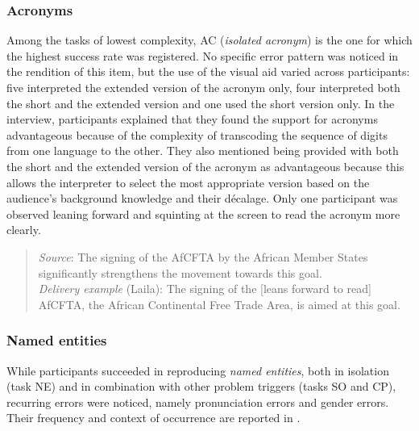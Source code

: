 \subsubsection{Acronyms}


Among the tasks of lowest complexity, AC (\textit{isolated acronym}) is the one for which the highest success rate was registered. No specific error pattern was noticed in the rendition of this item, but the use of the visual aid varied across participants: five interpreted the extended version of the acronym only, four interpreted both the short and the extended version and one used the short version only. In the interview, participants explained that they found the support for acronyms advantageous because of the complexity of transcoding the sequence of digits from one language to the other. They also mentioned being provided with both the short and the extended version of the acronym as advantageous because this allows the interpreter to select the most appropriate version based on the audience’s background knowledge and their décalage. Only one participant was observed leaning forward and squinting at the screen to read the acronym more clearly.
\begin{quote}
    \textit{Source}: The signing of the AfCFTA by the African Member States significantly strengthens the movement towards this goal.\\
\textit{Delivery example} (Laila): The signing of the [leans forward to read] AfCFTA, the African Continental Free Trade Area, is aimed at this goal.
\end{quote}

\subsubsection{Named entities}


While participants succeeded in reproducing \textit{named entities}, both in isolation (task NE) and in combination with other problem triggers (tasks SO and CP), recurring errors were noticed, namely pronunciation errors and gender errors. Their frequency and context of occurrence are reported in .

